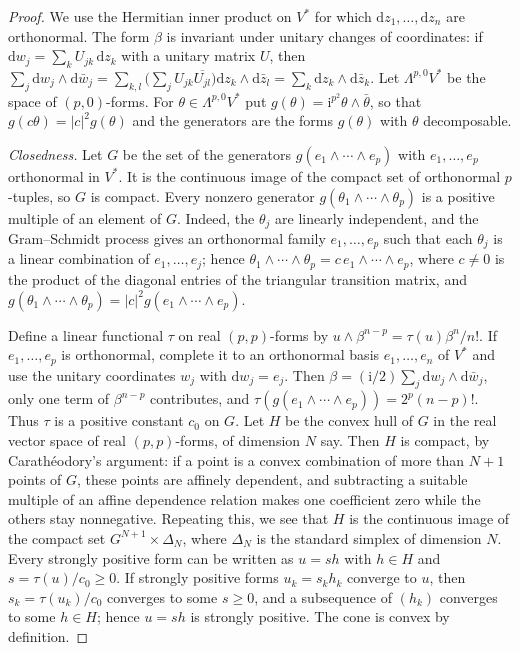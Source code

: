 \begin{proof}
We use the Hermitian inner product on $V^*$ for which $\mathrm dz_1,\ldots,\mathrm dz_n$ are orthonormal. The form $\beta$ is invariant under unitary changes of coordinates: if $\mathrm dw_j=\sum_kU_{jk}\,\mathrm dz_k$ with a unitary matrix $U$, then $\sum_j\mathrm dw_j\wedge\mathrm d\bar w_j=\sum_{k,l}\big(\sum_jU_{jk}\overline{U_{jl}}\big)\mathrm dz_k\wedge\mathrm d\bar z_l=\sum_k\mathrm dz_k\wedge\mathrm d\bar z_k$. Let $\Lambda^{p,0}V^*$ be the space of $(p,0)$-forms. For $\theta\in\Lambda^{p,0}V^*$ put $g(\theta)=\mathrm i^{p^2}\theta\wedge\bar\theta$, so that $g(c\theta)=|c|^2g(\theta)$ and the generators are the forms $g(\theta)$ with $\theta$ decomposable.

\emph{Closedness.} Let $G$ be the set of the generators $g(e_1\wedge\cdots\wedge e_p)$ with $e_1,\ldots,e_p$ orthonormal in $V^*$. It is the continuous image of the compact set of orthonormal $p$-tuples, so $G$ is compact. Every nonzero generator $g(\theta_1\wedge\cdots\wedge\theta_p)$ is a positive multiple of an element of $G$. Indeed, the $\theta_j$ are linearly independent, and the Gram--Schmidt process gives an orthonormal family $e_1,\ldots,e_p$ such that each $\theta_j$ is a linear combination of $e_1,\ldots,e_j$; hence $\theta_1\wedge\cdots\wedge\theta_p=c\,e_1\wedge\cdots\wedge e_p$, where $c\neq0$ is the product of the diagonal entries of the triangular transition matrix, and $g(\theta_1\wedge\cdots\wedge\theta_p)=|c|^2g(e_1\wedge\cdots\wedge e_p)$.

Define a linear functional $\tau$ on real $(p,p)$-forms by $u\wedge\beta^{n-p}=\tau(u)\beta^n/n!$. If $e_1,\ldots,e_p$ is orthonormal, complete it to an orthonormal basis $e_1,\ldots,e_n$ of $V^*$ and use the unitary coordinates $w_j$ with $\mathrm dw_j=e_j$. Then $\beta=(\mathrm{i}/2)\sum_j\mathrm dw_j\wedge\mathrm d\bar w_j$, only one term of $\beta^{n-p}$ contributes, and $\tau(g(e_1\wedge\cdots\wedge e_p))=2^p(n-p)!$. Thus $\tau$ is a positive constant $c_0$ on $G$. Let $H$ be the convex hull of $G$ in the real vector space of real $(p,p)$-forms, of dimension $N$ say. Then $H$ is compact, by Carath\'eodory's argument: if a point is a convex combination of more than $N+1$ points of $G$, these points are affinely dependent, and subtracting a suitable multiple of an affine dependence relation makes one coefficient zero while the others stay nonnegative. Repeating this, we see that $H$ is the continuous image of the compact set $G^{N+1}\times\Delta_N$, where $\Delta_N$ is the standard simplex of dimension $N$. Every strongly positive form can be written as $u=sh$ with $h\in H$ and $s=\tau(u)/c_0\geq0$. If strongly positive forms $u_k=s_kh_k$ converge to $u$, then $s_k=\tau(u_k)/c_0$ converges to some $s\geq0$, and a subsequence of $(h_k)$ converges to some $h\in H$; hence $u=sh$ is strongly positive. The cone is convex by definition.


\end{proof}

